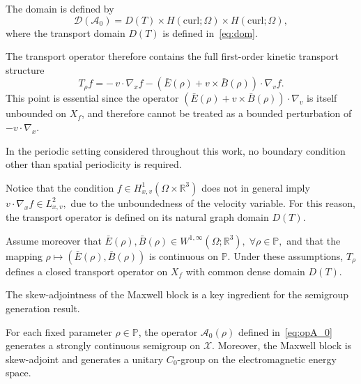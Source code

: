\documentclass[AMA,Times2COL]{WileyNJDv5}
\begin{document}
The domain is defined by
\[
\mathcal D(\mathcal A_0)
=
D(T)\times H(\mathrm{curl};\Omega)\times H(\mathrm{curl};\Omega),
\]
where the transport domain \(D(T)\) is defined in~\eqref{eq:dom}.

The transport operator therefore contains the full first-order kinetic transport structure
\[
T_\rho f
=
-\,v\!\cdot\!\nabla_x f
-
(\bar E(\rho)+v\times\bar B(\rho))\!\cdot\!\nabla_v f .
\]
This point is essential since the operator
\(
(\bar E(\rho)+v\times\bar B(\rho))\cdot\nabla_v
\)
is itself unbounded on \(X_f\), and therefore cannot be treated as a bounded perturbation of
\(
-v\cdot\nabla_x
\).

In the periodic setting considered throughout this work, no boundary condition other than spatial periodicity is required.

Notice that the condition
\(
f\in H^1_{x,v}(\Omega\times\mathbb R^3)
\)
does not in general imply
\(
v\!\cdot\!\nabla_x f\in L^2_{x,v},
\)
due to the unboundedness of the velocity variable. For this reason, the transport operator is defined on its natural graph domain \(D(T)\).

Assume moreover that
\(
\bar E(\rho),\bar B(\rho)
\in
W^{1,\infty}(\Omega;\mathbb R^3),
\;
\forall \rho\in\mathbb P,
\)
and that the mapping
\(
\rho\mapsto (\bar E(\rho),\bar B(\rho))
\)
is continuous on \(\mathbb P\).
Under these assumptions, \(T_\rho\) defines a closed transport operator on \(X_f\) with common dense domain \(D(T)\).

The skew-adjointness of the Maxwell block is a key ingredient for the semigroup generation result.

\begin{proposition}
\label{prop:A0-skew}
For each fixed parameter \(\rho\in\mathbb P\), the operator
\(\mathcal A_0(\rho)\) defined in~\eqref{eq:opA_0} generates a strongly continuous semigroup on \(\mathscr X\). Moreover, the Maxwell block is skew-adjoint and generates a unitary \(C_0\)-group on the electromagnetic
energy space.
\end{proposition}
\end{document}
